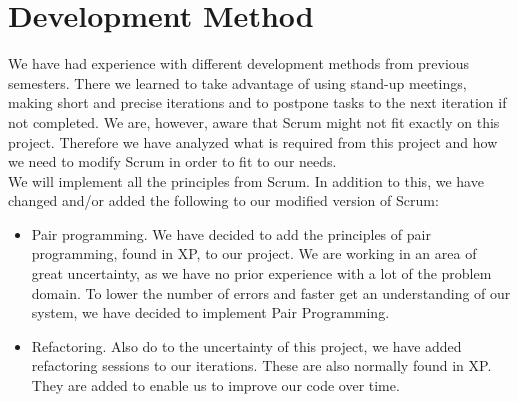 \section{Development Method}
We have had experience with different development methods from previous semesters.
There we learned to take advantage of using stand-up meetings, making short and precise iterations and to postpone tasks to the next iteration if not completed. 
We are, however, aware that Scrum might not fit exactly on this project.
Therefore we have analyzed what is required from this project and how we need to modify Scrum in order to fit to our needs. \\

We will implement all the principles from Scrum. In addition to this, we have changed and/or added the following to our modified version of Scrum:
\begin{itemize}
	\item Pair programming. We have decided to add the principles of pair programming, found in XP, to our project. We are working in an area of great uncertainty, as we have no prior experience with a lot of the problem domain. To lower the number of errors and faster get an understanding of our system, we have decided to implement Pair Programming.
	\item Refactoring. Also do to the uncertainty of this project, we have added refactoring sessions to our iterations. These are also normally found in XP. They are added to enable us to improve our code over time. 
\end{itemize}



